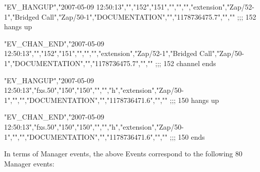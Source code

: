 \begin{astlisting}
"EV\_HANGUP","2007-05-09 12:50:13","","152","151","","","","extension","Zap/52-1","Bridged Call","Zap/50-1","DOCUMENTATION","","1178736475.7","",""                       ;;; 152 hangs up

"EV\_CHAN\_END","2007-05-09 12:50:13","","152","151","","","","extension","Zap/52-1","Bridged Call","Zap/50-1","DOCUMENTATION","","1178736475.7","",""                     ;;; 152 channel ends

"EV\_HANGUP","2007-05-09 12:50:13","fxs.50","150","150","","","h","extension","Zap/50-1","","","DOCUMENTATION","","1178736471.6","",""                                    ;;; 150 hangs up

"EV\_CHAN\_END","2007-05-09 12:50:13","fxs.50","150","150","","","h","extension","Zap/50-1","","","DOCUMENTATION","","1178736471.6","",""                                  ;;; 150 ends
\end{astlisting}

In terms of Manager events, the above Events correspond to the following 80
Manager events:

